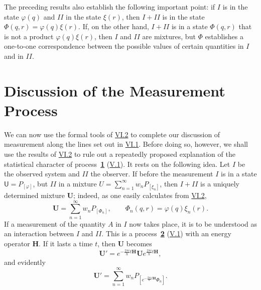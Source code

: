 \documentclass[fontsize=13pt,twoside,openany,headings=normal,parskip=false,bookmarkpackage=false,DIV=calc]{scrbook}
\begin{document}
The preceding results also establish the following important point: if $I$ is in the state $\varphi(q)$ and $II$ in the state $\xi(r)$, then $I+II$ is in the state $\Phi(q,r)=\varphi(q)\xi(r)$. If, on the other hand, $I+II$ is in a state $\Phi(q,r)$ that is not a product $\varphi(q)\xi(r)$, then $I$ and $II$ are mixtures, but $\Phi$ establishes a one-to-one correspondence between the possible values of certain quantities in $I$ and in $II$.

\hypertarget{origpage-233}{}%
\section{Discussion of the Measurement Process}\label{sec:VI.3}
We can now use the formal tools of \hyperref[sec:VI.2]{VI.2} to complete our discussion of measurement along the lines set out in \hyperref[sec:VI.1]{VI.1}. Before doing so, however, we shall use the results of \hyperref[sec:VI.2]{VI.2} to rule out a repeatedly proposed explanation of the statistical character of process~\hyperref[eq:V.1.1]{\textbf{1}} (\hyperref[sec:V.1]{V.1}). It rests on the following idea. Let $I$ be the observed system and $II$ the observer. If before the measurement $I$ is in a state $\mathsf U=P_{[\varphi]}$, but $II$ in a mixture $U=\sum_{n=1}^{\infty}w_nP_{[\xi_n]}$, then $I+II$ is a uniquely determined mixture $\boldsymbol U$; indeed, as one easily calculates from \hyperref[sec:VI.2]{VI.2},
\[
 \boldsymbol U=\sum_{n=1}^{\infty}w_nP_{[\Phi_n]},\qquad
 \Phi_n(q,r)=\varphi(q)\xi_n(r).
\]
If a measurement of the quantity $A$ in $I$ now takes place, it is to be understood as an interaction between $I$ and $II$. This is a process~\hyperref[eq:V.1.2]{\textbf{2}} (\hyperref[sec:V.1]{V.1}) with an energy operator $\boldsymbol H$. If it lasts a time $t$, then $\boldsymbol U$ becomes
\[
 \boldsymbol U'=e^{-\frac{2\pi i}{h}t\boldsymbol H}\boldsymbol Ue^{\frac{2\pi i}{h}t\boldsymbol H},
\]
and evidently
\[
 \boldsymbol U'=\sum_{n=1}^{\infty}w_nP_{[e^{-\frac{2\pi i}{h}t\boldsymbol H}\Phi_n]}.
\]
\end{document}
